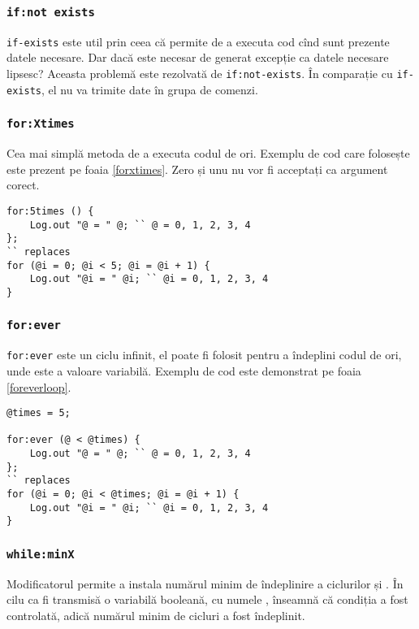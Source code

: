 \subsubsection{\lstinline|if:not exists|}

\lstinline|if-exists| este util prin ceea că permite de a executa cod cînd sunt prezente datele necesare. Dar dacă este necesar de generat excepție ca datele necesare lipsesc? Aceasta problemă este rezolvată de \lstinline|if:not-exists|. În comparație cu \lstinline|if-exists|, el nu va trimite date în grupa de comenzi.

\subsubsection{\lstinline|for:Xtimes|}

Cea mai simplă metoda de a executa codul de  ori. Exemplu de cod care folosește  este prezent pe foaia \ref{forxtimes}. Zero și unu nu vor fi acceptați ca argument corect.

\begin{lstlisting}[caption=Folosirea for:Xtimes, label=forxtimes]
for:5times () {
	Log.out "@ = " @; `` @ = 0, 1, 2, 3, 4
};
`` replaces
for (@i = 0; @i < 5; @i = @i + 1) {
	Log.out "@i = " @i; `` @i = 0, 1, 2, 3, 4
}
\end{lstlisting}

\subsubsection{\lstinline|for:ever|}

\lstinline|for:ever| este un ciclu infinit, el poate fi folosit pentru a îndeplini codul de  ori, unde  este a valoare variabilă. Exemplu de cod este demonstrat pe foaia \ref{foreverloop}.

\begin{lstlisting}[caption=Folosirea for:ever, label=foreverloop]
@times = 5;

for:ever (@ < @times) {
	Log.out "@ = " @; `` @ = 0, 1, 2, 3, 4
};
`` replaces
for (@i = 0; @i < @times; @i = @i + 1) {
	Log.out "@i = " @i; `` @i = 0, 1, 2, 3, 4
}
\end{lstlisting}

\subsubsection{\lstinline|while:minX|}

Modificatorul  permite a instala numărul minim de îndeplinire a ciclurilor  și . În cilu ca fi transmisă o variabilă booleană, cu numele , \true{} înseamnă că condiția a fost controlată, adică numărul minim de cicluri a fost îndeplinit.

